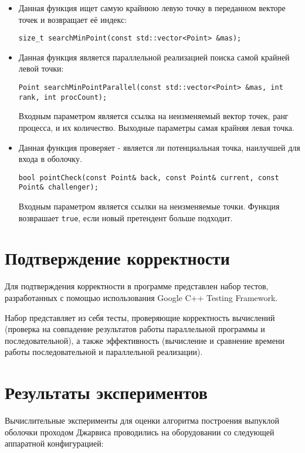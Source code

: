 \documentclass{report}
\begin{document}
\begin{itemize}
\par \item Данная функция ищет самую крайнюю левую точку в переданном векторе точек и возвращает её индекс:
\begin{lstlisting}
size_t searchMinPoint(const std::vector<Point> &mas);
\end{lstlisting}
\par \item Данная функция является параллельной реализацией поиска самой крайней левой точки:
\begin{lstlisting}
Point searchMinPointParallel(const std::vector<Point> &mas, int rank, int procCount);
\end{lstlisting}
\par Входным параметром является ссылка на неизменяемый вектор точек,  ранг процесса, и их количество. Выходные параметры самая крайняя левая точка.
\par \item Данная функция проверяет - является ли потенциальная точка, наилучшей для входа в оболочку.
\begin{lstlisting}
bool pointCheck(const Point& back, const Point& current, const Point& challenger);
\end{lstlisting}
\par Входным параметром является ссылки на неизменяемые точки. Функция возврашает \verb|true|, если новый претендент больше подходит.
\end{itemize}
\newpage

\section*{Подтверждение корректности}
Для подтверждения корректности в программе представлен набор тестов, разработанных с помощью использования Google C++ Testing Framework.
\par Набор представляет из себя тесты, проверяющие корректность вычислений (проверка на совпадение результатов работы параллельной программы и последовательной), а также эффективность (вычисление и сравнение времени работы последовательной и параллельной реализации).
\newpage

\section*{Результаты экспериментов}
Вычислительные эксперименты для оценки алгоритма построения выпуклой оболочки проходом Джарвиса проводились на оборудовании со следующей аппаратной конфигурацией:
\end{document}
